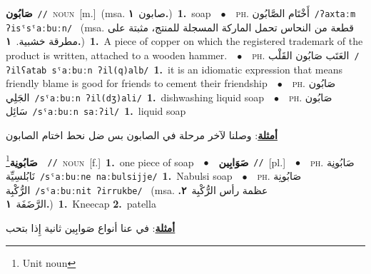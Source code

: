 \documentclass[10pt,a4paper,twoside]{article} %
\begin{document}
\begin{multicols}{2}
{{{{{{{{{\setlength\topsep{0pt}\textbf{\foreignlanguage{arabic}{صَابُون}}\ {\color{gray}\texttt{//}\color{black}}\ \textsc{noun}\ [m.]\ \color{gray}(msa. \foreignlanguage{arabic}{صابون}~\foreignlanguage{arabic}{\textbf{١.}})\color{black}\ \textbf{1.}~soap\ \ $\bullet$\ \ \textsc{ph.} \color{gray} \foreignlanguage{arabic}{أَخْتَام الصَّابُون}\color{black}\ {\color{gray}\texttt{/{\sffamily ʔaxtaːm ʔisˤsˤaːbuːn}/}\color{black}}\ \color{gray} (msa. \foreignlanguage{arabic}{قطعة من النحاس تحمل الماركة المسجلة للمنتج، مثبتة على مطرقة خشبية.}~\foreignlanguage{arabic}{\textbf{١.}})\color{black}\ \textbf{1.}~A piece of copper on which the registered trademark of the product is written, attached to a wooden hammer.\ \ $\bullet$\ \ \textsc{ph.} \color{gray} \foreignlanguage{arabic}{العَتَب صَابُون القَلْب}\color{black}\ {\color{gray}\texttt{/{\sffamily ʔilʕatab sˤaːbuːn ʔil(q)alb}/}\color{black}}\ \textbf{1.}~it is an idiomatic expression that means friendly blame is good for friends to cement their friendship\ \ $\bullet$\ \ \textsc{ph.} \color{gray} \foreignlanguage{arabic}{صَابُون الجَلِي}\color{black}\ {\color{gray}\texttt{/{\sffamily sˤaːbuːn ʔil(dʒ)ali}/}\color{black}}\ \textbf{1.}~dishwashing liquid soap\ \ $\bullet$\ \ \textsc{ph.} \color{gray} \foreignlanguage{arabic}{صَابُون سَائِل}\color{black}\ {\color{gray}\texttt{/{\sffamily sˤaːbuːn saːʔil}/}\color{black}}\ \textbf{1.}~liquid soap\  \begin{flushright}\color{gray}\foreignlanguage{arabic}{\textbf{\underline{\foreignlanguage{arabic}{أمثلة}}}: وصلنا لآخر مرحلة في الصابون بس ضل نحط اختام الصابون}\end{flushright}\color{black}} \vspace{2mm}

{\setlength\topsep{0pt}\textbf{\foreignlanguage{arabic}{صَابُونِة}}\footnote{Unit noun}\ \ {\color{gray}\texttt{//}\color{black}}\ \textsc{noun}\ [f.]\ \textbf{1.}~one piece of soap\ \ $\bullet$\ \ \setlength\topsep{0pt}\textbf{\foreignlanguage{arabic}{صَوَابِين}}\ {\color{gray}\texttt{//}\color{black}}\ [pl.]\ \ $\bullet$\ \ \textsc{ph.} \color{gray} \foreignlanguage{arabic}{صَابُونِة نَابُلسِيِّة}\color{black}\ {\color{gray}\texttt{/{\sffamily sˤaːbuːne naːbulsijje}/}\color{black}}\ \textbf{1.}~Nabulsi soap\ \ $\bullet$\ \ \textsc{ph.} \color{gray} \foreignlanguage{arabic}{صَابُونِة الرُّكْبِة}\color{black}\ {\color{gray}\texttt{/{\sffamily sˤaːbuːnit ʔirrukbe}/}\color{black}}\ \color{gray} (msa. \foreignlanguage{arabic}{عظمة رأس الرُّكْبِة}~\foreignlanguage{arabic}{\textbf{٢.}}  \foreignlanguage{arabic}{الرَّضَفَة}~\foreignlanguage{arabic}{\textbf{١.}})\color{black}\ \textbf{1.}~Kneecap  \textbf{2.}~patella\  \begin{flushright}\color{gray}\foreignlanguage{arabic}{\textbf{\underline{\foreignlanguage{arabic}{أمثلة}}}: في عنا أنواع صَوابِين ثانية إِذا بتحب}\end{flushright}\color{black}} \vspace{2mm}

}}}}}}}}
\end{multicols}
\end{document}
